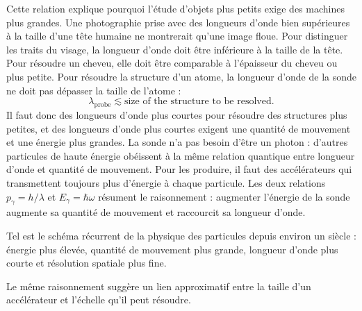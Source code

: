 Cette relation explique pourquoi l’étude d’objets plus petits exige des machines plus grandes. Une photographie prise avec des longueurs d’onde bien supérieures à la taille d’une tête humaine ne montrerait qu’une image floue. Pour distinguer les traits du visage, la longueur d’onde doit être inférieure à la taille de la tête. Pour résoudre un cheveu, elle doit être comparable à l’épaisseur du cheveu ou plus petite. Pour résoudre la structure d’un atome, la longueur d’onde de la sonde ne doit pas dépasser la taille de l’atome :
\begin{equation}
\lambda_{\mathrm{probe}}\lesssim
\text{size of the structure to be resolved}.
\end{equation}
Il faut donc des longueurs d’onde plus courtes pour résoudre des structures plus petites, et des longueurs d’onde plus courtes exigent une quantité de mouvement et une énergie plus grandes. La sonde n’a pas besoin d’être un photon : d’autres particules de haute énergie obéissent à la même relation quantique entre longueur d’onde et quantité de mouvement. Pour les produire, il faut des accélérateurs qui transmettent toujours plus d’énergie à chaque particule. Les deux relations \(p_\gamma=h/\lambda\) et \(E_\gamma=\hbar\omega\) résument le raisonnement : augmenter l’énergie de la sonde augmente sa quantité de mouvement et raccourcit sa longueur d’onde.

Tel est le schéma récurrent de la physique des particules depuis environ un siècle : énergie plus élevée, quantité de mouvement plus grande, longueur d’onde plus courte et résolution spatiale plus fine.

\begin{classroomqa}
\end{classroomqa}

Le même raisonnement suggère un lien approximatif entre la taille d’un accélérateur et l’échelle qu’il peut résoudre.

